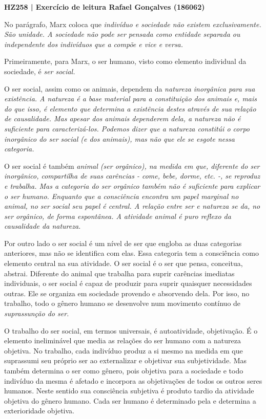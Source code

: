 \documentclass[12pt]{article}
\begin{document}
\noindent
\large\textbf{HZ258 | Exercício de leitura \hfill Rafael Gonçalves (186062)}
\break\hfill

No parágrafo, Marx coloca que \em indivíduo \em e \em sociedade \em não existem exclusivamente.
São unidade.
A sociedade não pode ser pensada como entidade separada ou independente dos indivíduos que a compõe e vice e versa.

Primeiramente, para Marx, o ser humano, visto como elemento individual da sociedade, é \em ser social\em.

O ser social, assim como os animais, dependem da \em natureza inorgânica \em para sua existência.
A natureza é a base material para a constituição dos animais e, mais do que isso, é elemento que determina a existência destes através de sua relação de causalidade.
Mas apesar dos animais dependerem dela, a natureza não é suficiente para caracterizá-los.
Podemos dizer que a natureza constitúi o corpo inorgânico do ser social (e dos animais), mas não que ele se esgote nessa categoria.

O ser social é também \em animal \em (ser orgânico), na medida em que, diferente do ser inorgânico, compartilha de suas carências - come, bebe, dorme, etc. -, se reproduz e \em trabalha\em.
Mas a categoria do ser orgânico também não é suficiente para explicar o ser humano.
Enquanto que a consciência encontra um papel marginal no animal, no ser social seu papel é central.
A relação entre ser e natureza se da, no ser orgânico, de forma espontânea.
A atividade animal é puro reflexo da causalidade da natureza.

Por outro lado o ser social é um nível de ser que engloba as duas categorias anteriores, mas não se identifica com elas.
Essa categoria tem a consciência como elemento central na sua atividade.
O ser social é o ser que pensa, conceitua, abstrai.
Diferente do animal que trabalha para suprir carências imediatas individuais, o ser social é capaz de produzir para suprir quaisquer necessidades outras.
Ele se organiza em sociedade provendo e absorvendo dela.
Por isso, no trabalho, todo o gênero humano se desenvolve num movimento contínuo de \em suprassunção \em do ser.

O trabalho do ser social, em termos universais, é autoatividade, objetivação. 
É o elemento ineliminável que media as relações do ser humano com a natureza objetiva.
No trabalho, cada indivíduo produz a si mesmo na medida em que suprassumi seu próprio ser ao externalizar e objetivar sua subjetividade.
Mas também determina o ser como gênero, pois objetiva para a sociedade e todo indivíduo da mesma é afetado e incorpora as objetivações de todos os outros seres humanos.
Neste sentido sua consciência subjetiva é produto tardio da atividade objetiva do gênero humano.
Cada ser humano é determinado pela e determina a exterioridade objetiva.
\end{document}
